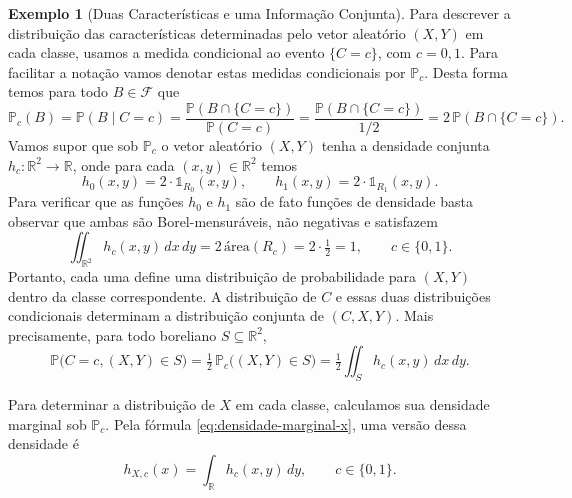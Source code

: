 \documentclass[12pt,portuguese]{article}
\theoremstyle{definition}
\newtheorem{example}[example]{Exemplo}
\theoremstyle{plainexercise}
\theoremstyle{starredexercise}
\theoremstyle{definition}
\begin{document}
\begin{example}[Duas Características e uma Informação Conjunta]
Para descrever a distribuição das características determinadas pelo vetor aleatório $(X,Y)$ 
em cada classe, usamos a medida condicional ao evento $\{C=c\}$, com $c=0,1$.
Para facilitar a notação vamos denotar estas medidas condicionais por $\mathbb{P}_{c}$.
Desta forma temos para todo $B\in\mathcal{F}$ que 
\[
  \mathbb{P}_c(B)=\mathbb{P}(B\mid C=c)
  =
  \frac{\mathbb{P}(B\cap\{C=c\})}{\mathbb{P}(C=c)}
  =
  \frac{\mathbb{P}(B\cap\{C=c\})}{1/2}
  =
  2\,\mathbb{P}(B\cap\{C=c\}).
\]
Vamos supor que sob $\mathbb{P}_c$ o vetor aleatório
$(X,Y)$ tenha a densidade conjunta $h_c:\mathbb{R}^2 \to\mathbb{R}$, onde
para cada $(x,y)\in\mathbb{R}^2$ temos
\[
  h_0(x,y)=2\cdot\mathds{1}_{R_0}(x,y),
  \qquad
  h_1(x,y)=2\cdot \mathds{1}_{R_1}(x,y).
\]
Para verificar que as funções $h_0$ e $h_1$ são de fato funções de densidade basta
observar que ambas são Borel-mensuráveis, não negativas e satisfazem 
\[
  \iint_{\mathbb{R}^2}h_c(x,y)\,dx\,dy
  =2\,\text{área}(R_c)=2\cdot\tfrac12=1,
  \qquad c\in\{0,1\}.
\]
Portanto, cada uma define uma distribuição de probabilidade para $(X,Y)$
dentro da classe correspondente.
A distribuição de $C$ e essas duas distribuições condicionais determinam a distribuição 
conjunta de $(C,X,Y)$. Mais precisamente, para todo boreliano
$S\subseteq\mathbb{R}^2$,
\[
  \mathbb{P}\bigl(C=c,(X,Y)\in S\bigr)
  =\tfrac12\,\mathbb{P}_c\bigl((X,Y)\in S\bigr)
  =\tfrac12\iint_S h_c(x,y)\,dx\,dy.
\]


Para determinar a distribuição de $X$ em cada classe, calculamos sua
densidade marginal sob $\mathbb{P}_c$. Pela fórmula
\eqref{eq:densidade-marginal-x}, uma versão dessa densidade é
\[
  h_{X,c}(x)=\int_{\mathbb{R}}h_c(x,y)\,dy,
  \qquad c\in\{0,1\}.
\]


\end{example}
\end{document}
